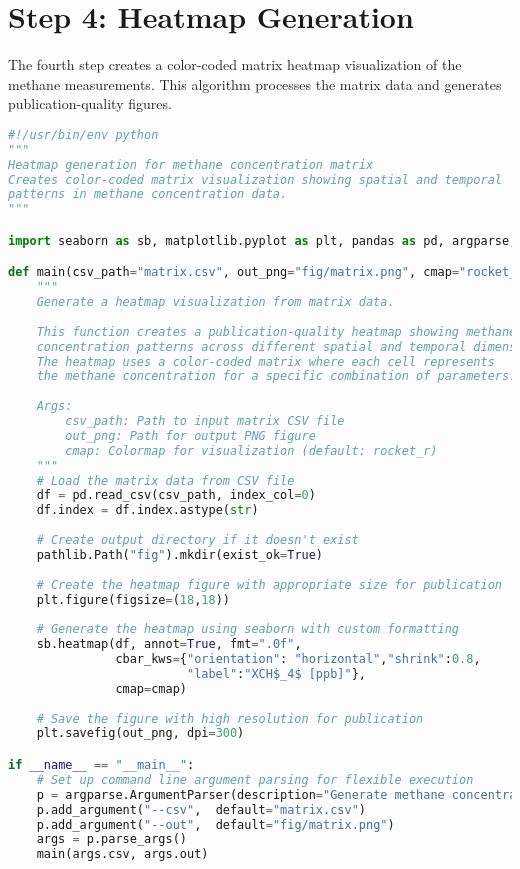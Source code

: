 \section{Step 4: Heatmap Generation}
\label{sec:appendixB_step4}

The fourth step creates a color-coded matrix heatmap visualization of the methane measurements. This algorithm processes the matrix data and generates publication-quality figures.

\begin{lstlisting}[language=Python, caption=Heatmap Generation Algorithm, label=alg:step04_heatmap]
#!/usr/bin/env python
"""
Heatmap generation for methane concentration matrix
Creates color-coded matrix visualization showing spatial and temporal
patterns in methane concentration data.
"""

import seaborn as sb, matplotlib.pyplot as plt, pandas as pd, argparse, pathlib

def main(csv_path="matrix.csv", out_png="fig/matrix.png", cmap="rocket_r"):
    """
    Generate a heatmap visualization from matrix data.
    
    This function creates a publication-quality heatmap showing methane
    concentration patterns across different spatial and temporal dimensions.
    The heatmap uses a color-coded matrix where each cell represents
    the methane concentration for a specific combination of parameters.
    
    Args:
        csv_path: Path to input matrix CSV file
        out_png: Path for output PNG figure
        cmap: Colormap for visualization (default: rocket_r)
    """
    # Load the matrix data from CSV file
    df = pd.read_csv(csv_path, index_col=0)
    df.index = df.index.astype(str)
    
    # Create output directory if it doesn't exist
    pathlib.Path("fig").mkdir(exist_ok=True)
    
    # Create the heatmap figure with appropriate size for publication
    plt.figure(figsize=(18,18))
    
    # Generate the heatmap using seaborn with custom formatting
    sb.heatmap(df, annot=True, fmt=".0f",
               cbar_kws={"orientation": "horizontal","shrink":0.8,
                         "label":"XCH$_4$ [ppb]"},
               cmap=cmap)
    
    # Save the figure with high resolution for publication
    plt.savefig(out_png, dpi=300)

if __name__ == "__main__":
    # Set up command line argument parsing for flexible execution
    p = argparse.ArgumentParser(description="Generate methane concentration heatmap")
    p.add_argument("--csv",  default="matrix.csv")
    p.add_argument("--out",  default="fig/matrix.png")
    args = p.parse_args()
    main(args.csv, args.out)
\end{lstlisting}

